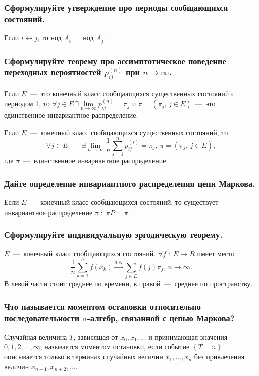 \subsubsection*{Сформулируйте утверждение про периоды сообщающихся состояний.}

Если $i \leftrightarrow j$, то нод $A_i = $ нод $A_j$.

\subsubsection*{Сформулируйте теорему про ассимптотическое поведение переходных
                вероятностей $p_{ij}^{ \left( n \right) }$ при $n \to \infty $.}

Если $E$~---~это конечный класс сообщающихся существенных состояний с периодом
1, то
$ \forall j \in E \,
  \exists \lim \limits_{n \to \infty } p_{ij}^{ \left( n \right) } = \pi_j$
и $ \pi = \left( \pi_j, \, j \in E \right) $~---~это единственное инвариантное
распределение.

Если $E$~---~конечный класс сообщающихся существенных состояний, то
\begin{equation*}
  \forall j \in E \qquad
  \exists \lim \limits_{n \to \infty }
    \frac{1}{n} \sum \limits_{s = 1}^n p_{ij}^{ \left( s \right) } = \pi_j, \,
  \pi = \left( \pi_j, \, j \in E \right),
\end{equation*}
где $ \pi $~---~единственное инвариантное распределение.

\subsubsection*{Дайте определение инвариантного распределения цепи Маркова.}

Если $E$~---~конечный класс сообщающихся состояний,
то существует инвариантное распределение $ \pi \; : \; \pi P = \pi $.

\subsubsection*{Сформулируйте индивидуальную эргодическую теорему.}

$E$~---~конечный класс сообщающихся состояний.
$ \forall f \; : \; E \to R$ имеет место
\begin{equation*}
  \frac{1}{n} \sum \limits_{k = 1}^n f \left( x_k \right) \overset{a.s.}{ \to }
  \sum \limits_{j \in E} f \left( j \right) \pi_j, \,
  n \to \infty.
\end{equation*}
В левой части стоит среднее по времени, в правой~---~среднее по пространству.

\subsubsection*{Что называется моментом остановки относительно
                последовательности $ \sigma $-алгебр,
                связанной с цепью Маркова?}

Случайная величина $T$, зависящая от $x_0, x_1, \dotsc $ и принимающая значения
$0, 1, 2, \dotsc, \infty $, называется моментом остановки,
если событие $ \left\{ T = n \right\} $
описывается только в терминах случайных величин $x_1, \dotsc, x_n$
без привлечения величин $x_{n + 1}, x_{n + 2}, \dotsc $.
